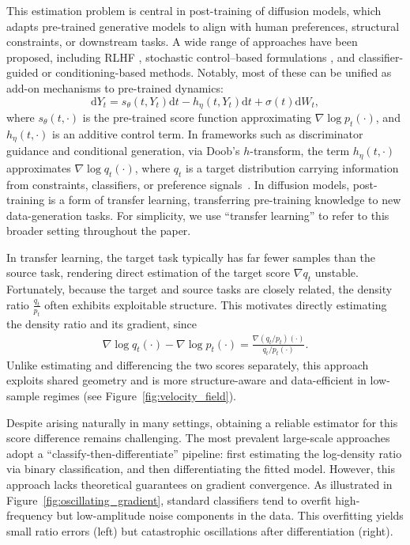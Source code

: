 \documentclass[11pt]{article}
\theoremstyle{plain}
\theoremstyle{definition}
\theoremstyle{remark}
\begin{document}
This estimation problem is central in post-training of diffusion models, which adapts pre-trained generative models to align with human preferences, structural constraints, or downstream tasks.
A wide range of approaches have been proposed, including RLHF
\cite{black2023training,fan2023reinforcement}, stochastic control–based formulations \cite{tang2024fine,han2024stochastic,uehara2024fine}, and classifier-guided or conditioning-based methods.
Notably, most of these can be unified as add-on mechanisms to pre-trained dynamics:
\begin{equation}
    \mathrm{d} Y_t = s_\theta(t,Y_t)\mathrm{d} t - h_\eta(t,Y_t)\mathrm{d} t + \sigma(t)\mathrm{d} W_t,
    \label{eq:controlled_dynamics}
\end{equation}
where $s_\theta(t,\cdot)$ is the pre-trained score function approximating $\nabla \log p_t(\cdot)$, and $h_\eta(t,\cdot)$ is an additive control term.
In frameworks such as discriminator guidance and conditional generation, via Doob's $h$-transform, the term $h_\eta(t,\cdot)$ approximates $\nabla \log q_t(\cdot)$, where $q_t$ is a target distribution carrying information from constraints, classifiers, or preference signals~\cite{DEFT,DP24,pidstrigach2025conditioning,howard2025control}. In diffusion models, post-training is a form of transfer learning, transferring pre-training knowledge to new data-generation tasks. For simplicity, we use “transfer learning” to refer to this broader setting throughout the paper.

In transfer learning, the target task typically has far fewer samples than the source task, rendering direct estimation of the target score $\nabla q_t$ unstable. Fortunately, because the target and source tasks are closely related, the density ratio $\frac{q_t}{p_t}$ often exhibits exploitable structure. This motivates directly estimating the density ratio and its gradient, since
\begin{eqnarray}
    \nabla \log q_t(\cdot)- \nabla \log p_t(\cdot) =  \frac{\nabla ({q_t}/{p_t})(\cdot)}{{q_t}/{p_t}(\cdot)}.
    \label{eq:score_diff_ratio}
\end{eqnarray}
Unlike estimating and differencing the two scores separately, this approach exploits shared geometry and is more structure-aware and data-efficient in low-sample regimes (see Figure~\ref{fig:velocity_field}).

Despite arising naturally in many settings, obtaining a reliable estimator for this score difference remains challenging.
The most prevalent large-scale approaches~\cite{ouyang2024transfer,kim2022refining} adopt a ``classify-then-differentiate'' pipeline: first estimating the log-density ratio via binary classification, and then differentiating the fitted model.
However, this approach lacks theoretical guarantees on gradient convergence.
As illustrated in Figure~\ref{fig:oscillating_gradient}, standard classifiers tend to overfit high-frequency but low-amplitude noise components in the data.
This overfitting yields small ratio errors (left) but catastrophic oscillations after differentiation (right).
\end{document}
